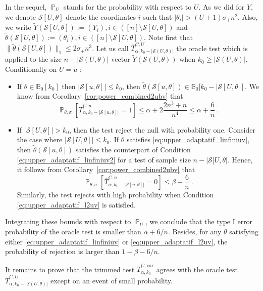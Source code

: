 \documentclass[twoside,11pt]{article}
\def\cS{\mathcal{S}}
\def\bbB{\mathbb{B}}
\renewcommand{\P}{\operatorname{\mathbb{P}}}
\newcommand{\<}{\langle}
\renewcommand{\>}{\rangle}
\begin{document}
In the sequel, $\P_U$ stands for the probability with respect to $U$.  As we did for $Y$, we denote $\cS[U,\theta]$ denote the coordinates $i$ such that $|\theta_i|>(U+1)\sigma_+ n^2$. Also, we write $\widetilde{Y}(\cS[U, \theta]):=(Y_i), i\in ([n]\setminus \cS[U, \theta])$ and $\widetilde{\theta}(\cS[U, \theta]):=(\theta_i), i\in ([n]\setminus \cS[U, \theta])$. Note first that
$\|\widetilde{\theta}(\cS[U, \theta])\|_1 \leq 2\sigma_+ n^3$. Let us call $\overline{T}^{C,U}_{\alpha,k_0 - |\cS(U,\theta)|}$ the oracle test which is  applied to the size $ n - |\cS(U,\theta)|$ vector $\widetilde{Y}(\cS(U,\theta))$ when $k_0 \geq |\cS(U,\theta)|$. Conditionally on $U = u$ : 
\begin{itemize}
\item If $\theta\in \bbB_{0}[k_0]$ then  $|\cS[u, \theta]| \leq k_0$,  then $\widetilde{\theta}(\cS[u, \theta])\in \bbB_0[k_0-|\cS[U,\theta|]$. We know from Corollary~\ref{cor:power_combined2ubv} that
\begin{equation}\label{eq:levlim}
  \P_{\theta,\sigma}[\overline{T}^{C,u}_{\alpha,k_0 - |\cS[u, \theta]|}=1]\leq \alpha + 2\frac{2n^3 +n}{n^4}  \leq \alpha +  \frac{6}{n}\  . 
\end{equation}
\item If $|\cS[U, \theta]|> k_0$, then the test reject the null with probability one. Consider the case where $|\cS[U, \theta]|\leq  k_0$. If 
$\theta$ satisfies  \eqref{eq:upper_adaptatif_linfiniuv}, then $\widetilde{\theta}(\cS[u, \theta])$ satisfies the counterpart of  Condition \eqref{eq:upper_adaptatif_linfiniuv2} for a test of sample size $n-|\cS[U,\theta|$. Hence, it follows  from Corollary~\ref{cor:power_combined2ubv} that
\begin{equation}\label{eq:powlim}
  \P_{\theta,\sigma}[\overline{T}^{C,u}_{\alpha,k_0 - |\cS[u, \theta]|}=0]\leq \beta + \frac{6}{n}\ . 
 \end{equation}
Similarly, the test rejects with high probability when Condition \eqref{eq:upper_adaptatif_l2uv} is satisfied.
\end{itemize}
Integrating these bounds with respect to $\P_U$, we conclude that the type I error probability of the oracle test is smaller than $\alpha+6/n$. Besides, for any $\theta$ satisfying either \eqref{eq:upper_adaptatif_linfiniuv} or \eqref{eq:upper_adaptatif_l2uv}, the probability of rejection is larger than $1-\beta-6/n$. 




It remains to prove that the trimmed test $\overline{T}^{C,\mathrm{var}}_{\alpha,k_0}$ agrees with the oracle test $\overline{T}^{C,U}_{\alpha,k_0 - |\cS(U,\theta)|}$ except on an event of small probability. 
\end{document}
